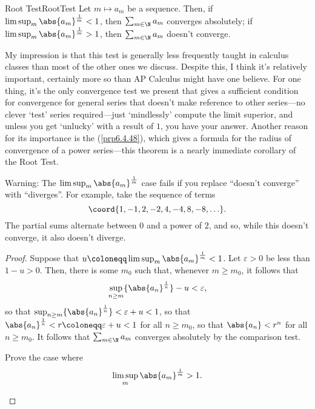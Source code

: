 \begin{prp}{Root Test}{RootTest}
Let $m\mapsto a_m$ be a sequence.  Then, if $\limsup _m\abs{a_m}^{\frac{1}{m}}<1$, then $\sum _{m\in \N}a_m$ converges absolutely; if $\limsup _m\abs{a_m}^{\frac{1}{m}}>1$, then $\sum _{m\in \N}a_m$ doesn't converge.
\begin{rmk}
My impression is that this test is generally less frequently taught in calculus classes than most of the other ones we discuss.  Despite this, I think it's relatively important, certainly more so than AP Calculus might have one believe.  For one thing, it's the only convergence test we present that gives a sufficient condition for convergence for general series that doesn't make reference to other series---no clever `test' series required---just `mindlessly' compute the limit superior, and unless you get `unlucky' with a result of $1$, you have your answer.  Another reason for its importance is the  (\cref{prp6.4.48}), which gives a formula for the radius of convergence of a power series---this theorem is a nearly immediate corollary of the Root Test.
\end{rmk}
\begin{wrn}
Warning:  The $\limsup _m\abs{a_m}^{\frac{1}{m}}$ case fails if you replace ``doesn't converge'' with ``diverges''.  For example, take the sequence of terms
\begin{equation}
\coord{1,-1,2,-2,4,-4,8,-8,\ldots}.
\end{equation}
The partial sums alternate between $0$ and a power of $2$, and so, while this doesn't converge, it also doesn't diverge.
\end{wrn}
\begin{proof}
Suppose that $u\coloneqq \limsup _m\abs{a_m}^{\frac{1}{m}}<1$.  Let $\varepsilon >0$ be less than $1-u>0$.  Then, there is some $m_0$ such that, whenever $m\geq m_0$, it follows that
\begin{equation}
\sup _{n\geq m}\{ \abs{a_n}^{\frac{1}{n}}\} -u<\varepsilon ,
\end{equation}
so that $\sup _{n\geq m}\{ \abs{a_n}^{\frac{1}{n}}\} <\varepsilon +u<1$, so that $\abs{a_n}^{\frac{1}{n}}<r\coloneqq \varepsilon +u<1$ for all $n\geq m_0$, so that $\abs{a_n}<r^n$ for all $n\geq m_0$.  It follows that $\sum _{m\in \N}a_m$ converges absolutely by the comparison test.

\begin{exr}[breakable=false]{}{}
Prove the case where
\begin{equation}
\limsup _m\abs{a_m}^{\frac{1}{m}}>1.
\end{equation}
\end{exr}
\end{proof}
\end{prp}
